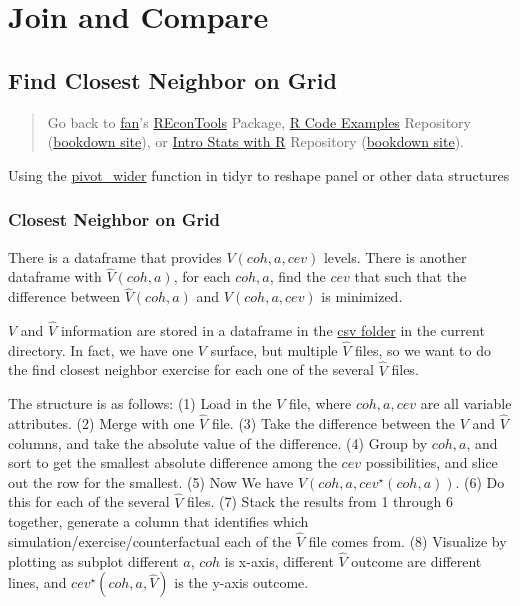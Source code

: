\documentclass[
]{book}
\begin{document}
\hypertarget{join-and-compare}{%
\section{Join and Compare}\label{join-and-compare}}

\hypertarget{find-closest-neighbor-on-grid}{%
\subsection{Find Closest Neighbor on Grid}\label{find-closest-neighbor-on-grid}}

\begin{quote}
Go back to \href{http://fanwangecon.github.io/}{fan}'s \href{https://fanwangecon.github.io/REconTools/}{REconTools} Package, \href{https://fanwangecon.github.io/R4Econ/}{R Code Examples} Repository (\href{https://fanwangecon.github.io/R4Econ/bookdown}{bookdown site}), or \href{https://fanwangecon.github.io/Stat4Econ/}{Intro Stats with R} Repository (\href{https://fanwangecon.github.io/Stat4Econ/bookdown}{bookdown site}).
\end{quote}

Using the \href{https://tidyr.tidyverse.org/reference/pivot_wider.html}{pivot\_wider} function in tidyr to reshape panel or other data structures

\hypertarget{closest-neighbor-on-grid}{%
\subsubsection{Closest Neighbor on Grid}\label{closest-neighbor-on-grid}}

There is a dataframe that provides \(V(coh, a, cev)\) levels. There is another dataframe with \(\hat{V}(coh, a)\), for each \(coh, a\), find the \(cev\) that such that the difference between \(\hat{V}(coh, a)\) and \(V(coh, a, cev)\) is minimized.

\(V\) and \(\hat{V}\) information are stored in a dataframe in the \href{https://github.com/FanWangEcon/R4Econ/tree/master/panel/join/_file/csv}{csv folder} in the current directory. In fact, we have one \(V\) surface, but multiple \(\hat{V}\) files, so we want to do the find closest neighbor exercise for each one of the several \(\hat{V}\) files.

The structure is as follows: (1) Load in the \(V\) file, where \(coh, a, cev\) are all variable attributes. (2) Merge with one \(\hat{V}\) file. (3) Take the difference between the \(V\) and \(\hat{V}\) columns, and take the absolute value of the difference. (4) Group by \(coh, a\), and sort to get the smallest absolute difference among the \(cev\) possibilities, and slice out the row for the smallest. (5) Now We have \(V(coh, a, cev^{\star}(coh, a))\). (6) Do this for each of the several \(\hat{V}\) files. (7) Stack the results from 1 through 6 together, generate a column that identifies which simulation/exercise/counterfactual each of the \(\hat{V}\) file comes from. (8) Visualize by plotting as subplot different \(a\), \(coh\) is x-axis, different \(\hat{V}\) outcome are different lines, and \(cev^{\star}\left(coh, a, \hat{V}\right)\) is the y-axis outcome.
\end{document}
